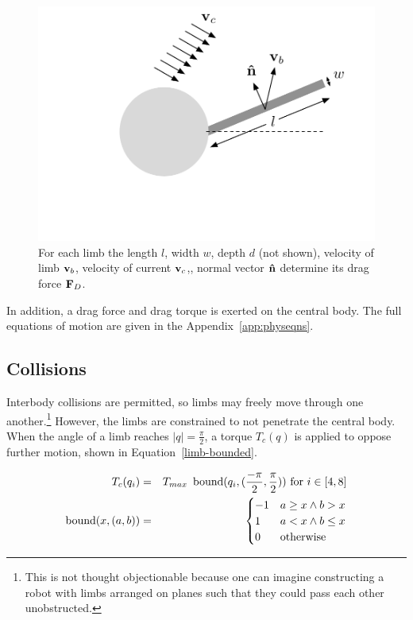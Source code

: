 \begin{figure}[h]  
  \centering
  \includegraphics[scale=0.7]{fig/drag-force.pdf} 
  \vspace{-45pt}
  \caption[Diagram of drag force]{\label{drag-force}For each limb the
    length $l$, width $w$, depth $d$ (not shown), velocity of limb
    $\mathbf{v}_b $, velocity of current $\mathbf{v}_c$,, normal vector $\mathbf{\hat{n}}$
    determine its drag force $\mathbf{F}_D$.}
\end{figure}

In addition, a drag force and drag torque is exerted on the central
body.  The full equations of motion are given in the
Appendix~\ref{app:physeqns}.

\subsection{Collisions}

Interbody collisions are permitted, so limbs may freely move through
one another.\footnote{This is not thought objectionable because one
  can imagine constructing a robot with limbs arranged on planes such
  that they could pass each other unobstructed.}  However, the limbs
are constrained to not penetrate the central body.  When the angle of
a limb reaches $|q| = \frac{\pi}{2}$, a torque $T_c(q)$ is applied to
oppose further motion, shown in Equation~\ref{limb-bounded}.

\begin{eqnarray}
  T_c(q_{i}) &=& T_{max}~\operatorname{bound}(q_{i}, (\frac{- \pi}{2}, \frac{\pi}{2})) \text{ for } i \in [4,8] \label{limb-bounded} \\
  \operatorname{bound}(x, (a,b)) &=& \begin{cases}
    -1 & a \ge x \wedge b > x \\ 
    1 & a < x \wedge b \le x \\
    0 & \text{otherwise}
  \end{cases}
\end{eqnarray}


